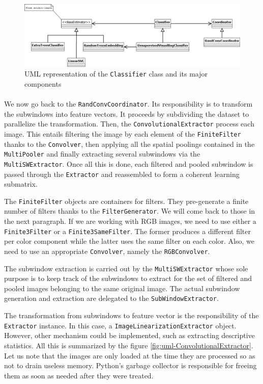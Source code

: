 \documentclass[a4paper]{report}
\begin{document}
		
		\begin{figure}
			\centering
				\includegraphics[width=1.00\textwidth]{images/uml-classifier.png}
			\caption{UML representation of the \texttt{Classifier} class and its major components}
			\label{fig:uml-classifier}
		\end{figure}
		
		
		\paragraph{}
		We now go back to the \texttt{RandConvCoordinator}. Its responsibility is to transform the subwindows into feature vectors. It proceeds by subdividing the dataset to parallelize the transformation. Then, the \texttt{ConvolutionalExtractor} process each image. This entails filtering the image by each element of the \texttt{FiniteFilter} thanks to the \texttt{Convolver}, then applying all the spatial poolings contained in the \texttt{MultiPooler} and finally extracting several subwindows via the \texttt{MultiSWExtractor}. Once all this is done, each filtered and pooled subwindow is passed through the \texttt{Extractor} and reassembled to form a coherent learning submatrix.
		\par
		The \texttt{FiniteFilter} objects are containers for filters. They pre-generate a finite number of filters thanks to the \texttt{FilterGenerator}. We will come back to those in the next paragraph. If we are working with RGB images, we need to use either a \texttt{Finite3Filter} or a \texttt{Finite3SameFilter}. The former produces a different filter per color component while the latter uses the same filter on each color. Also, we need to use an appropriate \texttt{Convolver}, namely the \texttt{RGBConvolver}.
		\par
		The subwindow extraction is carried out by the \texttt{MultiSWExtractor} whose sole purpose is to keep track of the subwindows to extract for the set of filtered and pooled images belonging to the same original image. The actual subwindow generation and extraction are delegated to the \texttt{SubWindowExtractor}.
		\par
		The transformation from subwindows to feature vector is the responsibility of the \texttt{Extractor} instance. In this case, a \texttt{ImageLinearizationExtractor} object. However, other mechanism could be implemented, such as extracting descriptive statistics.
		All this is summarized by the figure \ref{fig:uml-ConvolutionalExtractor}. Let us note that the images are only loaded at the time they are processed so as not to drain useless memory. Python's garbage collector is responsible for freeing them as soon as needed after they were treated.
		
\end{document}

